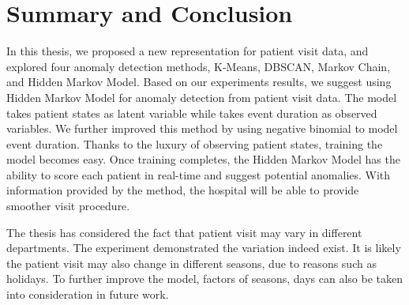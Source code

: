 \chapter{Summary and Conclusion}
\label{chapter:summary}
In this thesis, we proposed a new representation for patient visit data, and explored four anomaly detection methods, K-Means, DBSCAN, Markov Chain, and Hidden Markov Model. Based on our experiments results, we suggest using Hidden Markov Model for anomaly detection from patient visit data. The model takes patient states as latent variable while takes event duration as observed variables. We further improved this method by using negative binomial to model event duration. Thanks to the luxury of observing patient states, training the model becomes easy. Once training completes, the Hidden Markov Model has the ability to score each patient in real-time and suggest potential anomalies. With information provided by the method, the hospital will be able to provide smoother visit procedure.

The thesis has considered the fact that patient visit may vary in different departments. The experiment demonstrated the variation indeed exist. It is likely the patient visit may also change in different seasons, due to reasons such as holidays. To further improve the model, factors of seasons, days can also be taken into consideration in future work. 

